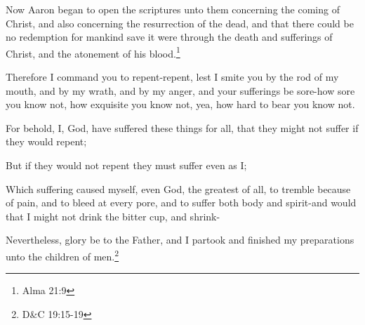 \begin{displayquote}
Now Aaron began to open the scriptures unto them concerning the coming of Christ, 
and also concerning the resurrection of the dead, and that there could be no 
redemption for mankind save it were through the death and sufferings of Christ, 
and the atonement of his blood.\footnote{Alma 21:9}
\end{displayquote}

\begin{displayquote}
Therefore I command you to repent-repent, lest I smite you by the rod of my mouth, 
and by my wrath, and by my anger, and your sufferings be sore-how sore you know not, 
how exquisite you know not, yea, how hard to bear you know not.

For behold, I, God, have suffered these things for all, that they might not suffer 
if they would repent;

But if they would not repent they must suffer even as I;

Which suffering caused myself, even God, the greatest of all, to tremble because of 
pain, and to bleed at every pore, and to suffer both body and spirit-and would that 
I might not drink the bitter cup, and shrink-

Nevertheless, glory be to the Father, and I partook and finished my preparations 
unto the children of men.\footnote{D\&C 19:15-19}
\end{displayquote}